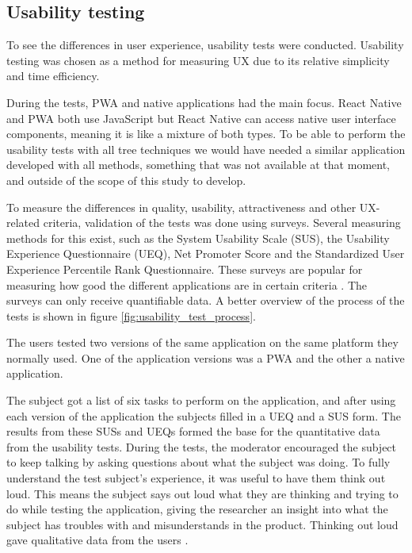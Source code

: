 \subsection{Usability testing}

To see the differences in user experience, usability tests were conducted. Usability testing was chosen as a method for measuring UX due to its relative simplicity and time efficiency.

During the tests, PWA and native applications had the main focus. React Native and PWA both use JavaScript but React Native can access native user interface components, meaning it is like a mixture of both types. To be able to perform the usability tests with all tree techniques we would have needed a similar application developed with all methods, something that was not available at that moment, and outside of the scope of this study to develop. 

To measure the differences in quality, usability, attractiveness and other UX-related criteria, validation of the tests was done using surveys. Several measuring methods for this exist, such as the System Usability Scale (SUS), the Usability Experience Questionnaire (UEQ), Net Promoter Score and the Standardized User Experience Percentile Rank Questionnaire. These surveys are popular for measuring how good the different applications are in certain criteria \cite{Rauschenberger2013, Kortum2014}. The surveys can only receive quantifiable data.  A better overview of the process of the tests is shown in figure \ref{fig:usability_test_process}.

The users tested two versions of the same application on the same platform they normally used. One of the application versions was a PWA and the other a native application.

The subject got a list of six tasks to perform on the application, and after using each version of the application the subjects filled in a UEQ and a SUS form. The results from these SUSs and UEQs formed the base for the quantitative data from the usability tests. During the tests, the moderator encouraged the subject to keep talking by asking questions about what the subject was doing. To fully understand the test subject’s experience, it was useful to have them think out loud. This means the subject says out loud what they are thinking and trying to do while testing the application, giving the researcher an insight into what the subject has troubles with and misunderstands in the product. Thinking out loud gave qualitative data from the users \cite{Nielsen2012}.

